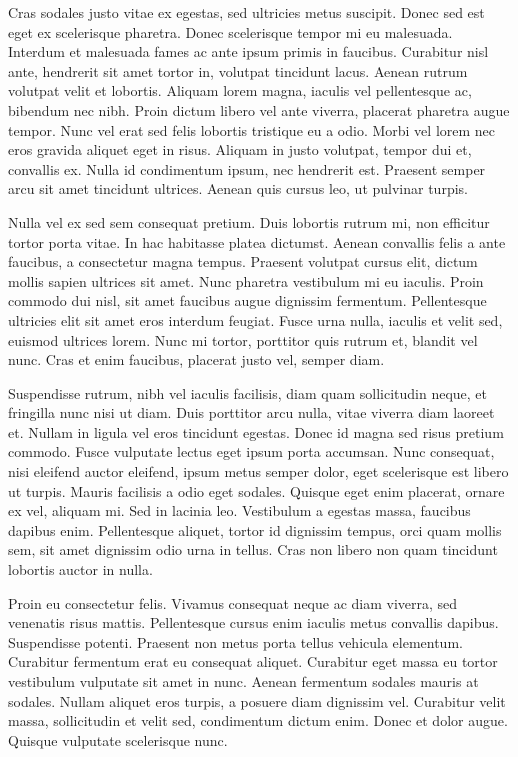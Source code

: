Cras sodales justo vitae ex egestas, sed ultricies metus suscipit. Donec sed est eget ex scelerisque pharetra. Donec scelerisque tempor mi eu malesuada. Interdum et malesuada fames ac ante ipsum primis in faucibus. Curabitur nisl ante, hendrerit sit amet tortor in, volutpat tincidunt lacus. Aenean rutrum volutpat velit et lobortis. Aliquam lorem magna, iaculis vel pellentesque ac, bibendum nec nibh. Proin dictum libero vel ante viverra, placerat pharetra augue tempor. Nunc vel erat sed felis lobortis tristique eu a odio. Morbi vel lorem nec eros gravida aliquet eget in risus. Aliquam in justo volutpat, tempor dui et, convallis ex. Nulla id condimentum ipsum, nec hendrerit est. Praesent semper arcu sit amet tincidunt ultrices. Aenean quis cursus leo, ut pulvinar turpis.

Nulla vel ex sed sem consequat pretium. Duis lobortis rutrum mi, non efficitur tortor porta vitae. In hac habitasse platea dictumst. Aenean convallis felis a ante faucibus, a consectetur magna tempus. Praesent volutpat cursus elit, dictum mollis sapien ultrices sit amet. Nunc pharetra vestibulum mi eu iaculis. Proin commodo dui nisl, sit amet faucibus augue dignissim fermentum. Pellentesque ultricies elit sit amet eros interdum feugiat. Fusce urna nulla, iaculis et velit sed, euismod ultrices lorem. Nunc mi tortor, porttitor quis rutrum et, blandit vel nunc. Cras et enim faucibus, placerat justo vel, semper diam.

Suspendisse rutrum, nibh vel iaculis facilisis, diam quam sollicitudin neque, et fringilla nunc nisi ut diam. Duis porttitor arcu nulla, vitae viverra diam laoreet et. Nullam in ligula vel eros tincidunt egestas. Donec id magna sed risus pretium commodo. Fusce vulputate lectus eget ipsum porta accumsan. Nunc consequat, nisi eleifend auctor eleifend, ipsum metus semper dolor, eget scelerisque est libero ut turpis. Mauris facilisis a odio eget sodales. Quisque eget enim placerat, ornare ex vel, aliquam mi. Sed in lacinia leo. Vestibulum a egestas massa, faucibus dapibus enim. Pellentesque aliquet, tortor id dignissim tempus, orci quam mollis sem, sit amet dignissim odio urna in tellus. Cras non libero non quam tincidunt lobortis auctor in nulla.

Proin eu consectetur felis. Vivamus consequat neque ac diam viverra, sed venenatis risus mattis. Pellentesque cursus enim iaculis metus convallis dapibus. Suspendisse potenti. Praesent non metus porta tellus vehicula elementum. Curabitur fermentum erat eu consequat aliquet. Curabitur eget massa eu tortor vestibulum vulputate sit amet in nunc. Aenean fermentum sodales mauris at sodales. Nullam aliquet eros turpis, a posuere diam dignissim vel. Curabitur velit massa, sollicitudin et velit sed, condimentum dictum enim. Donec et dolor augue. Quisque vulputate scelerisque nunc.


